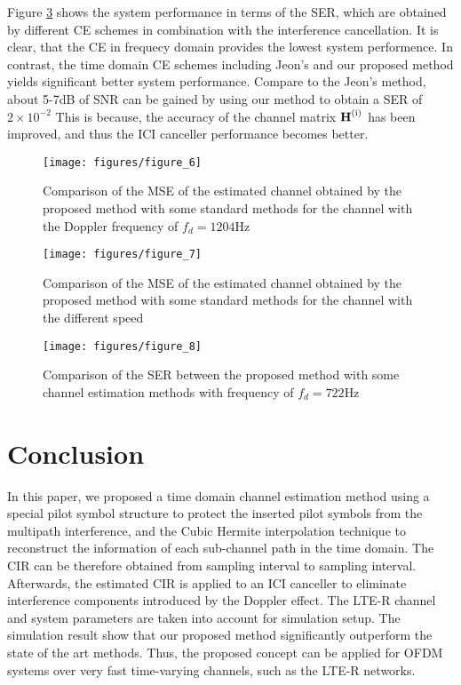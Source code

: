 \documentclass[AMA]{WileyNJD-v1}
\begin{document}
{{{Figure \ref{fig:ser722hz} shows the system performance in terms of the SER, which are obtained by different CE schemes in combination with the interference cancellation. It is clear, that the CE in frequecy domain provides the lowest system performence. In contrast, the time domain CE schemes including Jeon's and our proposed method yields significant better system performance. 
Compare to the Jeon's method, about  5-7dB of SNR can be gained by using our method to obtain a SER of  $2\times 10^{-2}$  This is because, the accuracy of the channel matrix  $\rm{\textbf H^{(i)}}$ has been improved, and thus the ICI canceller performance becomes better. 
%				
\begin{figure}
	\centering
	\texttt{[image: figures/figure\_6]}
	\caption{Comparison of the MSE of the estimated channel obtained by the proposed	method with some standard methods for the channel with the Doppler frequency of $f_{d}=1204$Hz}
	\label{fig:1204hz}
\end{figure}
				
\begin{figure}
	\centering
	\texttt{[image: figures/figure\_7]}
	\caption{Comparison of the MSE of the estimated channel obtained by the proposed	method with some standard methods for the channel with the different speed}
	\label{fig:msespeed}
\end{figure}
				
\begin{figure}
	\centering
	\texttt{[image: figures/figure\_8]}
	\caption{Comparison of the SER between the proposed
						method with some channel estimation methods with
						frequency of $f_{d}=722$Hz}
	\label{fig:ser722hz}
\end{figure}	
%	
\section{Conclusion}\label{section-5}
				
In this paper, we proposed a time domain channel estimation method using a special pilot symbol structure to protect the inserted pilot symbols from the multipath interference, and the Cubic Hermite interpolation technique to reconstruct the information of each sub-channel path in the time domain. The CIR can be therefore obtained from sampling interval to  sampling interval. Afterwards, the estimated CIR is applied to an ICI canceller to eliminate interference components introduced by the Doppler effect. The LTE-R channel and system parameters are taken into account for simulation setup. The simulation result show that our proposed method significantly outperform the state of the art methods. Thus, the proposed concept can be applied for OFDM systems over very fast time-varying channels, such as the LTE-R networks.
				
}}}
\end{document}
